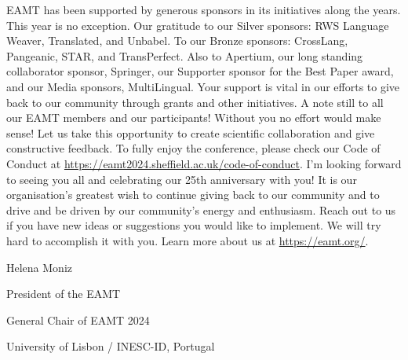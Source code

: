 EAMT has been supported by generous sponsors in its initiatives along the years. This year is no exception. Our gratitude to our Silver sponsors: RWS Language Weaver, Translated, and Unbabel. To our Bronze sponsors: CrossLang, Pangeanic, STAR, and TransPerfect. Also to Apertium, our long standing collaborator sponsor, Springer, our Supporter sponsor for the Best Paper award, and our Media sponsors, MultiLingual. Your support is vital in our efforts to give back to our community through grants and other initiatives.
A note still to all our EAMT members and our participants! Without you no effort would make sense! Let us take this opportunity to create scientific collaboration and give constructive feedback. To fully enjoy the conference, please check our Code of Conduct at \url{https://eamt2024.sheffield.ac.uk/code-of-conduct}. I’m looking forward to seeing you all and celebrating our 25th anniversary with you!
It is our organisation's greatest wish to continue giving back to our community and to drive and be driven by our community’s energy and enthusiasm. Reach out to us if you have new ideas or suggestions you would like to implement. We will try hard to accomplish it with you. Learn more about us at \url{https://eamt.org/}.

\bigbreak

Helena Moniz


\bigbreak


President of the EAMT

General Chair of EAMT 2024

University of Lisbon / INESC-ID, Portugal


